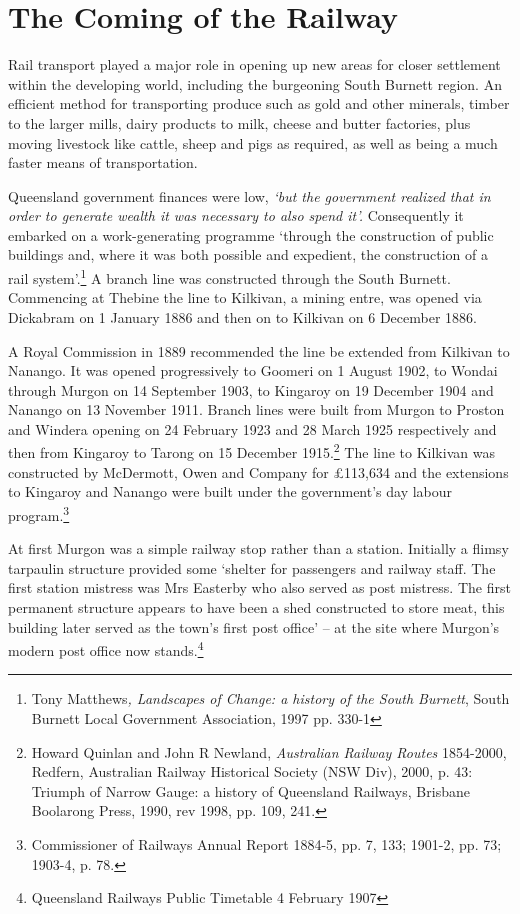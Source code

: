 \section{The Coming of the Railway}



Rail transport played a major role in opening up new areas for closer settlement within the developing world, including the burgeoning South Burnett region. An efficient method for transporting produce such as gold and other minerals, timber to the larger mills, dairy products to milk, cheese and butter factories, plus moving livestock like cattle, sheep and pigs as required, as well as being a much faster means of transportation.



Queensland government finances were low, \emph{`but the government realized that in order to generate wealth it was necessary to also spend it'.} Consequently it embarked on a work-generating programme `through the construction of public buildings and, where it was both possible and expedient, the construction of a rail system'.\footnote{Tony Matthews\emph{, Landscapes of Change: a history of the South Burnett}, South Burnett Local Government Association, 1997 pp. 330-1} A branch line was constructed through the South Burnett. Commencing at Thebine the line to Kilkivan, a mining entre, was opened via Dickabram on 1 January 1886 and then on to Kilkivan on 6 December 1886.


A Royal Commission in 1889 recommended the line be extended from Kilkivan to Nanango. It was opened progressively to Goomeri on 1 August 1902, to Wondai through Murgon on 14 September 1903, to Kingaroy on 19 December 1904 and Nanango on 13 November 1911. Branch lines were built from Murgon to Proston and Windera opening on 24 February 1923 and 28 March 1925 respectively and then from Kingaroy to Tarong on 15 December 1915.\footnote{Howard Quinlan and John R Newland, \emph{Australian Railway Routes} 1854-2000, Redfern, Australian Railway Historical Society (NSW Div), 2000, p. 43: Triumph of Narrow Gauge: a history of Queensland Railways, Brisbane Boolarong Press, 1990, rev 1998, pp. 109, 241.} The line to Kilkivan was constructed by McDermott, Owen and Company for \pounds113,634 and the extensions to Kingaroy and Nanango were built under the government's day labour program.\footnote{Commissioner of Railways Annual Report 1884-5, pp. 7, 133; 1901-2, pp. 73; 1903-4, p. 78.}


At first Murgon was a simple railway stop rather than a station. Initially a flimsy tarpaulin structure provided some `shelter for passengers and railway staff. The first station mistress was Mrs Easterby who also served as post mistress. The first permanent structure appears to have been a shed constructed to store meat, this building later served as the town's first post office' -- at the site where Murgon's modern post office now stands.\footnote{Queensland Railways Public Timetable 4 February 1907}


